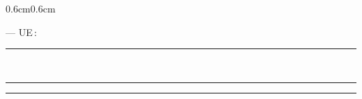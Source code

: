 {\begin{titlepage}
\begin{adjustwidth}{0.6cm}{0.6cm}
    \vspace{0.8cm}

    \begin{center}
        {\color{GrisMoyen}\small\textsc{%
            \doctypedevoir{} --- UE\,:\,\docue%
        }}\\[1.2ex]
        {\color{BleuMoyen}\rule{0.5\linewidth}{0.5pt}}
    \end{center}

    \vspace{0.5cm}

    \begin{center}
        {\color{BleuPrimaire}
            \fontsize{22}{28}\selectfont\bfseries
            \MakeUppercase{\doctitre}
        }\\[1.0ex]
        {\color{OrangeAccent}\large\itshape \docsoustitre}
    \end{center}

    \vspace{0.6cm}

    \begin{center}
        {\color{BleuMoyen}\rule{0.28\linewidth}{0.5pt}}%
        \enspace{\color{OrangeAccent}\rule{0.08\linewidth}{1.5pt}}\enspace%
        {\color{BleuMoyen}\rule{0.28\linewidth}{0.5pt}}
    \end{center}

    \vspace{0.5cm}

    \ifx\docnormes\empty\else
    \begin{center}
        {\color{GrisClair}\footnotesize \docnormes}
    \end{center}
    \vspace{0.4cm}
    \fi

    \ifx\docepigraphe\empty\else
    \vspace{0.3cm}
    \begin{center}
        {\color{GrisMoyen}\itshape\small \og{}\docepigraphe\fg{}}
    \end{center}
    \vspace{0.3cm}
    \fi

    \vfill


\end{adjustwidth}
\end{titlepage}}
